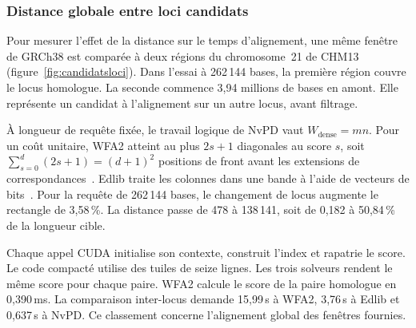 \subsubsection{Distance globale entre loci candidats}\label{sec:loci-accelerateur}
Pour mesurer l’effet de la distance sur le temps d’alignement, une même fenêtre de GRCh38 est comparée à deux régions du chromosome~21 de CHM13 (figure~\ref{fig:candidatsloci}). Dans l’essai à 262\,144 bases, la première région couvre le locus homologue. La seconde commence 3,94 millions de bases en amont. Elle représente un candidat à l’alignement sur un autre locus, avant filtrage.

À longueur de requête fixée, le travail logique de NvPD vaut \(W_{\mathrm{dense}}=mn\). Pour un coût unitaire, WFA2 atteint au plus \(2s+1\) diagonales au score \(s\), soit \(\sum_{s=0}^{d}(2s+1)=(d+1)^2\) positions de front avant les extensions de correspondances~\cite{wfa}. Edlib traite les colonnes dans une bande à l'aide de vecteurs de bits~\cite{edlib,myers}. Pour la requête de 262\,144 bases, le changement de locus augmente le rectangle de 3,58\,\%. La distance passe de 478 à 138\,141, soit de 0,182 à 50,84\,\% de la longueur cible.


Chaque appel CUDA initialise son contexte, construit l'index et rapatrie le score. Le code compacté utilise des tuiles de seize lignes. Les trois solveurs rendent le même score pour chaque paire. WFA2 calcule le score de la paire homologue en 0,390\,ms. La comparaison inter-locus demande 15,99\,s à WFA2, 3,76\,s à Edlib et 0,637\,s à NvPD. Ce classement concerne l'alignement global des fenêtres fournies.

